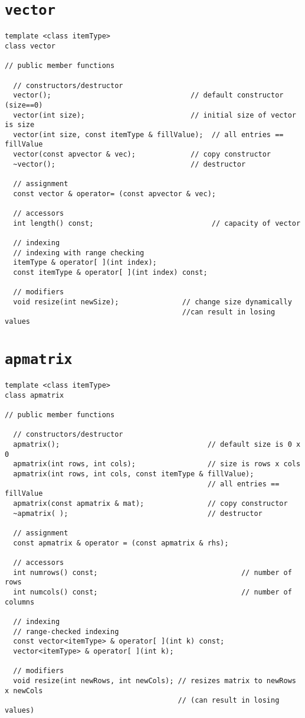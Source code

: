 \section{{\tt vector}}

\begin{verbatim}
template <class itemType>
class vector

// public member functions

  // constructors/destructor
  vector();                                 // default constructor (size==0)
  vector(int size);                         // initial size of vector is size
  vector(int size, const itemType & fillValue);  // all entries == fillValue
  vector(const apvector & vec);             // copy constructor
  ~vector();                                // destructor

  // assignment
  const vector & operator= (const apvector & vec);

  // accessors
  int length() const;                            // capacity of vector

  // indexing
  // indexing with range checking
  itemType & operator[ ](int index);           
  const itemType & operator[ ](int index) const;

  // modifiers
  void resize(int newSize);               // change size dynamically
                                          //can result in losing values
\end{verbatim}

\section{{\tt apmatrix}}

\begin{verbatim}
template <class itemType>
class apmatrix

// public member functions

  // constructors/destructor
  apmatrix();                                   // default size is 0 x 0
  apmatrix(int rows, int cols);                 // size is rows x cols
  apmatrix(int rows, int cols, const itemType & fillValue);
                                                // all entries == fillValue
  apmatrix(const apmatrix & mat);               // copy constructor
  ~apmatrix( );                                 // destructor

  // assignment
  const apmatrix & operator = (const apmatrix & rhs);

  // accessors
  int numrows() const;                                  // number of rows
  int numcols() const;                                  // number of columns

  // indexing
  // range-checked indexing
  const vector<itemType> & operator[ ](int k) const;  
  vector<itemType> & operator[ ](int k);

  // modifiers
  void resize(int newRows, int newCols); // resizes matrix to newRows x newCols
                                         // (can result in losing values)
\end{verbatim}


